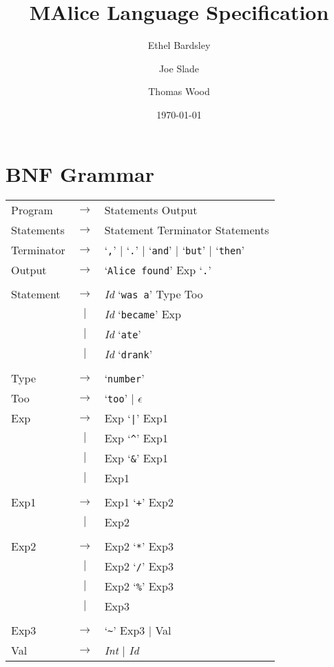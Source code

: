 \documentclass[a4wide, 11pt]{article}
\begin{document}
\title{MAlice Language Specification}

\author{Ethel Bardsley \and Joe Slade \and Thomas Wood}

\date{\today}         %

\maketitle            %

\section{BNF Grammar} 
\begin{tabular}{lcl}
Program     & $\to$ & Statements Output \\
Statements  & $\to$ & Statement Terminator Statements \\
Terminator  & $\to$ & `\verb:,:' $|$ `\verb:.:' $|$ `\verb:and:' $|$ `\verb:but:' $|$ `\verb:then:' \\
Output      & $\to$ & `\verb:Alice found:' Exp `\verb:.:' \\
\\
Statement   & $\to$ & \emph{Id} `\verb|was a|' Type Too \\
            &  $|$  & \emph{Id} `\verb|became|' Exp \\
            &  $|$  & \emph{Id} `\verb|ate|' \\
            &  $|$  & \emph{Id} `\verb|drank|' \\
\\
Type        & $\to$ & `\verb|number|' \\
Too         & $\to$ & `\verb|too|' $|$ $\epsilon$ \\
Exp         & $\to$ & Exp `\verb:|:' Exp1 \\
            &  $|$  & Exp `\verb:^:' Exp1 \\
            &  $|$  & Exp `\verb:&:' Exp1 \\
            &  $|$  & Exp1 \\
\\
Exp1        & $\to$ & Exp1 `\verb:+:' Exp2 \\
            &  $|$  & Exp2 \\
\\
Exp2        & $\to$ & Exp2 `\verb:*:' Exp3 \\
            &  $|$  & Exp2 `\verb:/:' Exp3 \\
            &  $|$  & Exp2 `\verb:%:' Exp3 \\
            &  $|$  & Exp3 \\
\\
Exp3        & $\to$ & `\verb:~:' Exp3 $|$ Val \\
Val         & $\to$ & \emph{Int} $|$ \emph{Id} \\
\end{tabular}
\end{document}
